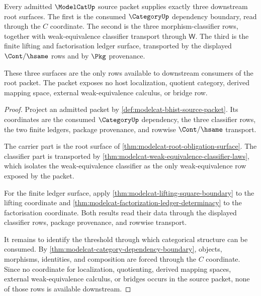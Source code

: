 \begin{theorem}
\label{thm:modelcat-root-threshold-obligation-triad}
Every admitted $\ModelCatUp$ source packet supplies exactly three downstream
root surfaces. The first is the consumed $\CategoryUp$ dependency boundary,
read through the $C$ coordinate. The second is the three morphism-classifier
rows, together with weak-equivalence classifier transport through
$\mathsf{W}$. The third is the finite lifting and factorisation ledger surface,
transported by the displayed $\Cont/\hsame$ rows and by $\Pkg$ provenance.

These three surfaces are the only rows available to downstream consumers of
the root packet. The packet exposes no host localization, quotient category,
derived mapping space, external weak-equivalence calculus, or bridge row.
\end{theorem}
\begin{proof}
Project an admitted packet by
\autoref{def:modelcat-bhist-source-packet}. Its coordinates are the consumed
$\CategoryUp$ dependency, the three classifier rows, the two finite ledgers,
package provenance, and rowwise $\Cont/\hsame$ transport.

The carrier part is the root surface of
\autoref{thm:modelcat-root-obligation-surface}. The classifier part is
transported by
\autoref{thm:modelcat-weak-equivalence-classifier-laws}, which isolates the
weak-equivalence classifier as the only weak-equivalence row exposed by the
packet.

For the finite ledger surface, apply
\autoref{thm:modelcat-lifting-square-boundary} to the lifting coordinate and
\autoref{thm:modelcat-factorization-ledger-determinacy} to the factorisation
coordinate. Both results read their data through the displayed classifier
rows, package provenance, and rowwise transport.

It remains to identify the threshold through which categorical structure can
be consumed. By \autoref{thm:modelcat-category-dependency-boundary}, objects,
morphisms, identities, and composition are forced through the $C$ coordinate.
Since no coordinate for localization, quotienting, derived mapping spaces,
external weak-equivalence calculus, or bridges occurs in the source packet,
none of those rows is available downstream.
\end{proof}


